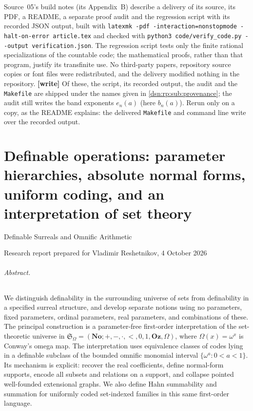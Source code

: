 \documentclass[11pt,a4paper]{article}
\numberwithin{equation}{section}
\theoremstyle{definition}
\theoremstyle{remark}
\newcommand{\No}{\mathbf{No}}
\newcommand{\Oz}{\mathbf{Oz}}
\newcommand{\fn}[1]{\nolinkurl{#1}}
\newcommand{\Somega}{\mathfrak S_\Omega}
\begin{document}
Source~05's build notes (its Appendix~B) describe a delivery of its source,
its PDF, a README, a separate proof audit and the regression script with its
recorded JSON output, built with
\verb|latexmk -pdf -interaction=nonstopmode -halt-on-error article.tex| and
checked with \verb|python3 code/verify_code.py --output verification.json|.
The regression script tests only the finite rational specializations of the
countable code; the mathematical proofs, rather than that program, justify
its transfinite use. No third-party papers, repository source copies or font
files were redistributed, and the delivery modified nothing in the
repository. \textbf{[write]} Of these, the script, its recorded output, the
audit and the \fn{Makefile} are shipped under the names given in
\cref{dsn:rp:sub:provenance}; the audit still writes the band exponents
$e_n(a)$ (here $b_n(a)$). Rerun only on a copy, as the README explains: the
delivered \fn{Makefile} and command line write over the recorded output.





\clearpage
\part{Definable operations: parameter hierarchies, absolute normal forms, uniform coding, and an interpretation of set theory}
\label{dsn:part:op}

\setcounter{section}{29}
\renewcommand{\theHsection}{op.\arabic{section}}

{\large Definable Surreals and Omnific Arithmetic\par}
\smallskip
{Research report prepared for Vladimir Reshetnikov, 4 October 2026\par}

\paragraph{Abstract.}
We distinguish definability in the surrounding universe of sets from
definability in a specified surreal structure, and develop separate notions
using no parameters, fixed parameters, ordinal parameters, real parameters,
and combinations of these.  The principal construction is a parameter-free
first-order interpretation of the set-theoretic universe in
\(\Somega=(\No;+,-,\cdot,<,0,1,\Oz,\Omega)\), where
\(\Omega(x)=\omega^x\) is Conway's omega map.  The interpretation uses
equivalence classes of codes lying in a definable subclass of the bounded
omnific monomial interval \(\{\omega^a:0<a<1\}\).  Its mechanism is explicit:
recover the real coefficients, define normal-form supports, encode all
subsets and relations on a support, and collapse pointed well-founded
extensional graphs.  We also define Hahn summability and summation for
uniformly coded set-indexed families in this same first-order language.
\end{document}

